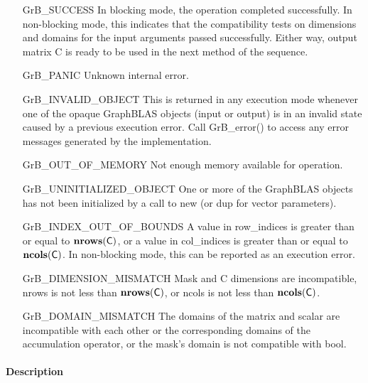 \begin{itemize}[leftmargin=2.1in]
    \item[{\sf GrB\_SUCCESS}]         In blocking mode, the operation completed
    successfully. In non-blocking mode, this indicates that the compatibility 
    tests on dimensions and domains for the input arguments passed successfully. 
    Either way, output matrix {\sf C} is ready to be used in the next method of 
    the sequence.

    \item[{\sf GrB\_PANIC}]            Unknown internal error.
    
    \item[{\sf GrB\_INVALID\_OBJECT}] This is returned in any execution mode 
    whenever one of the opaque GraphBLAS objects (input or output) is in an invalid 
    state caused by a previous execution error.  Call {GrB\_error()} to access 
    any error messages generated by the implementation.

    \item[{\sf GrB\_OUT\_OF\_MEMORY}]  Not enough memory available for operation.

    \item[{\sf GrB\_UNINITIALIZED\_OBJECT}] One or more of the GraphBLAS objects
    has not been initialized by a call to {\sf new} (or {\sf dup} for vector
    parameters).

    \item[{\sf GrB\_INDEX\_OUT\_OF\_BOUNDS}]  A value in {\sf row\_indices} is greater
    than or equal to $\bold{nrows}({\sf C})$, or a value in {\sf col\_indices} is greater
    than or equal to $\bold{ncols}({\sf C})$.  In non-blocking mode, this can be
    reported as an execution error.

    \item[{\sf GrB\_DIMENSION\_MISMATCH}]  {\sf Mask} and {\sf C} dimensions are
    incompatible, {\sf nrows} is not less than $\bold{nrows}({\sf C})$, or
    {\sf ncols} is not less than $\bold{ncols}({\sf C})$. 

    \item[{\sf GrB\_DOMAIN\_MISMATCH}]     The domains of the matrix and scalar are
	incompatible with each other or the corresponding domains of the 
    accumulation operator, or the mask's domain is not compatible with bool.
\end{itemize}


\paragraph{Description}


